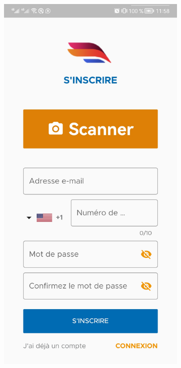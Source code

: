 \begin{itemize}[label=$\ast$]
\begin{figure}[!ht]
			\centering
			\begin{subfigure}{0.3\textwidth}
				\includegraphics[width=\hsize, valign=m ]{./Template LaTeX/Images/4.jpg}

\end{subfigure}
\end{figure}
\end{itemize}

